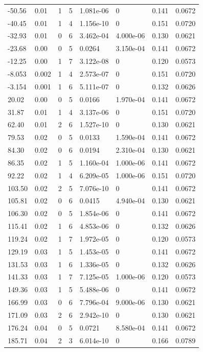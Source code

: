 \documentclass[preview]{standalone}
\begin{document}
{{\begin{tabular}{L{1.2cm}C{1.2cm} C{0.3cm}C{0.5cm} C{1.4cm}C{1.4cm} C{1.4cm}C{1.4cm}}
  -50.56  &  0.01  & 1     &  5 &  1.081e-06  & 0  & 0.141 &  0.0672   \\ 
  -40.45  &  0.01  & 1     &  4 &  1.156e-10  & 0  & 0.151 &  0.0720   \\ 
  -32.93  &  0.01  & 0     &  6 &  3.462e-04  & 4.000e-06  & 0.130 &  0.0621   \\ 
  -23.68  &  0.00  & 0     &  5 &  0.0264  & 3.150e-04  & 0.141 &  0.0672   \\ 
  -12.25  &  0.00  & 1     &  7 &  3.122e-08  & 0  & 0.120 &  0.0573   \\ 
  -8.053  &  0.002  & 1     &  4 &  2.573e-07  & 0  & 0.151 &  0.0720   \\ 
  -3.154  &  0.001  & 1     &  6 &  5.111e-07  & 0  & 0.132 &  0.0626   \\ 
  20.02  &  0.00  & 0     &  5 &  0.0166  & 1.970e-04  & 0.141 &  0.0672   \\ 
  31.87  &  0.01  & 1     &  4 &  3.137e-06  & 0  & 0.151 &  0.0720   \\ 
  62.40  &  0.01  & 2     &  6 &  1.527e-10  & 0  & 0.130 &  0.0621   \\ 
  79.53  &  0.02  & 0     &  5 &  0.0133  & 1.590e-04  & 0.141 &  0.0672   \\ 
  84.30  &  0.02  & 0     &  6 &  0.0194  & 2.310e-04  & 0.130 &  0.0621   \\ 
  86.35  &  0.02  & 1     &  5 &  1.160e-04  & 1.000e-06  & 0.141 &  0.0672   \\ 
  92.22  &  0.02  & 1     &  4 &  6.209e-05  & 1.000e-06  & 0.151 &  0.0720   \\ 
  103.50  &  0.02  & 2     &  5 &  7.076e-10  & 0  & 0.141 &  0.0672   \\ 
  105.81  &  0.02  & 0     &  6 &  0.0415  & 4.940e-04  & 0.130 &  0.0621   \\ 
  106.30  &  0.02  & 0     &  5 &  1.854e-06  & 0  & 0.141 &  0.0672   \\ 
  115.41  &  0.02  & 1     &  6 &  4.853e-06  & 0  & 0.132 &  0.0626   \\ 
  119.24  &  0.02  & 1     &  7 &  1.972e-05  & 0  & 0.120 &  0.0573   \\ 
  129.19  &  0.03  & 1     &  5 &  1.453e-05  & 0  & 0.141 &  0.0672   \\ 
  131.53  &  0.03  & 1     &  6 &  1.336e-05  & 0  & 0.132 &  0.0626   \\ 
  141.33  &  0.03  & 1     &  7 &  7.125e-05  & 1.000e-06  & 0.120 &  0.0573   \\ 
  149.36  &  0.03  & 1     &  5 &  5.488e-06  & 0  & 0.141 &  0.0672   \\ 
  166.99  &  0.03  & 0     &  6 &  7.796e-04  & 9.000e-06  & 0.130 &  0.0621   \\ 
  171.09  &  0.03  & 2     &  6 &  2.942e-10  & 0  & 0.130 &  0.0621   \\ 
  176.24  &  0.04  & 0     &  5 &  0.0721  & 8.580e-04  & 0.141 &  0.0672   \\ 
  185.71  &  0.04  & 2     &  3 &  6.014e-10  & 0  & 0.166 &  0.0789   \\ 
\hline 
\end{tabular} 

}}
\end{document}

